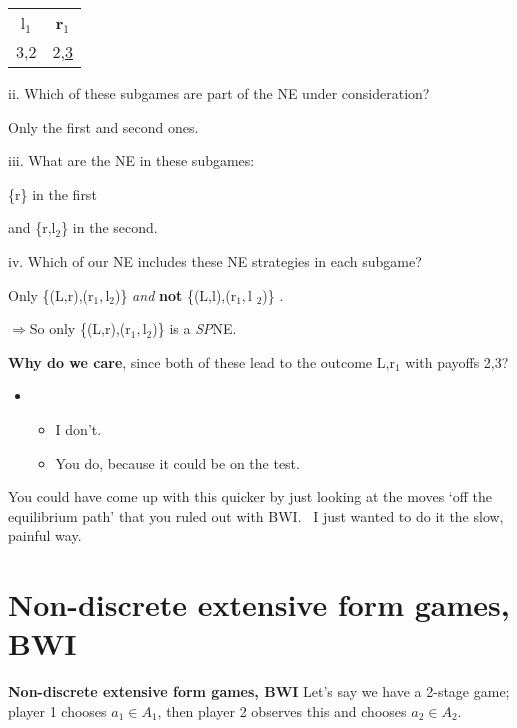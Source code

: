 \begin{tabular}{cc}
l$_{1}$ & \textbf{r}$_{1}$ \\
3,2 & 2,\underline{3}%
\end{tabular}



ii. Which of these subgames are part of the NE under consideration?

\bigskip

Only the first and second ones.

\bigskip

iii. What are the NE in these subgames:

\{r\} in the first

and \{r,l$_{2}$\} in the second.

\bigskip



iv. Which of our NE includes these NE strategies in each subgame?

Only \{(L,r),(r$_{1},$l$_{2}$)\} \textit{and} \textbf{not }\{(L,l),(r$_{1},$l%
$_{2}$)\} . \

$\mathbf{\Longrightarrow }$So only \{(L,r),(r$_{1},$l$_{2}$)\} is a \textit{%
SP}NE.

\bigskip



\textbf{Why do we care}, since both of these lead to the outcome L,r$_{1}$
with payoffs 2,3?

\begin{itemize}
\item
\begin{itemize}
\item I don't.

\item You do, because it could be on the test.
\end{itemize}
\end{itemize}

\bigskip

You could have come up with this quicker by just looking at the moves `off
the equilibrium path' that you ruled out with BWI. \ I just wanted to do it
the slow, painful way.


\section{\textbf{Non-discrete extensive form games, BWI}}

\textbf{Non-discrete extensive form games, BWI}
Let's say we have a 2-stage game; player 1 chooses $a_{1}\in A_{1}$, then
player 2 observes this and chooses $a_{2}\in A_{2}$.

